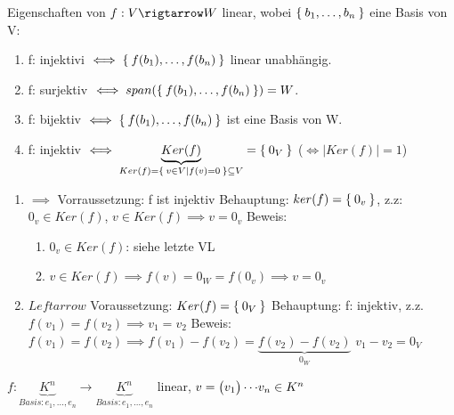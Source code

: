\documentclass{../tudscript}
\begin{document}
        Eigenschaften von $f: V \rigtarrow W$ linear, wobei $\Set{b_1, \ldots, b_n}$ eine Basis von V:
        \begin{enumerate}
            \item f: injektivi $\iff \Set{f(b_1), \ldots, f(b_n)}$ linear unabhängig.
            \item f: surjektiv $\iff span(\Set{f(b_1), \ldots, f(b_n)}) = W$.
            \item f: bijektiv $\iff \Set{f(b_1), \ldots, f(b_n)}$ ist eine Basis von W.
            \item f: injektiv $\iff \underbrace{Ker(f)}_{Ker(f) = \Set{v \in V \mid f(v) =0} \subseteq V} = \Set{0_V}$ ($\iff |Ker(f)| = 1$)
        \end{enumerate}

       \begin{enumerate}
        \item $\implies$
        Vorraussetzung: f ist injektiv
        Behauptung: $ker(f) = \Set{0_v}$, z.z: $0_v \in Ker(f)$, $v \in Ker(f) \implies v = 0_v$
        Beweis: 
            \begin{enumerate}
                \item $0_v \in Ker(f)$: siehe letzte VL
                \item $v \in Ker(f) \implies f(v) = 0_W = f(0_v) \implies v = 0_v$
            \end{enumerate}

        \item $Leftarrow$
            Voraussetzung: $Ker(f) = \Set{0_V}$
            Behauptung: f: injektiv, z.z. $f(v_1) = f(v_2) \implies v_1 = v_2$
            Beweis: $f(v_1) = f(v_2) \implies f(v_1) - f(v_2) = \underbrace{f(v_2) - f(v_2)}_{0_W}$
            $v_1 - v_2 = 0_V$
        \end{enumerate}
        $f: \underbrace{K^n}_{Basis: e_1, \ldots, e_n} \rightarrow \underbrace{K^n}_{Basis: e_1, \ldots, e_n}$ linear, $v = \begin{pmatrix}v_1\end{pmatrix}{\cdots}{v_n} \in K^n$



       
\end{document}

